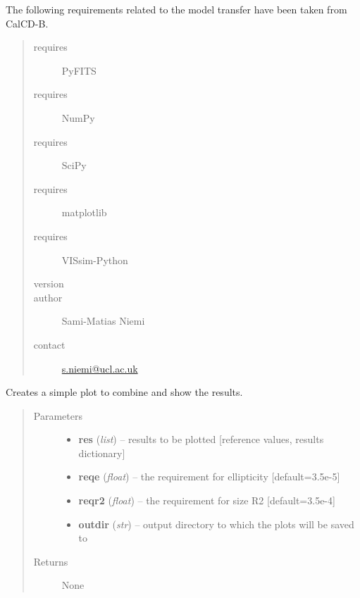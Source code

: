 \documentclass[a4paper,11pt,english]{sphinxmanual}
\begin{document}
The following requirements related to the model transfer have been taken from CalCD-B.
\begin{quote}\begin{description}
\item[{requires}] \leavevmode
PyFITS

\item[{requires}] \leavevmode
NumPy

\item[{requires}] \leavevmode
SciPy

\item[{requires}] \leavevmode
matplotlib

\item[{requires}] \leavevmode
VISsim-Python

\item[{version}] 

\item[{author}] \leavevmode
Sami-Matias Niemi

\item[{contact}] \leavevmode
\href{mailto:s.niemi@ucl.ac.uk}{s.niemi@ucl.ac.uk}

\end{description}\end{quote}

\begin{fulllineitems}
\label{analysis:analysis.nonlinearityModelTransfer.plotResults}
Creates a simple plot to combine and show the results.
\begin{quote}\begin{description}
\item[{Parameters}] \leavevmode\begin{itemize}
\item {} 
\textbf{res} (\emph{list}) -- results to be plotted {[}reference values, results dictionary{]}

\item {} 
\textbf{reqe} (\emph{float}) -- the requirement for ellipticity {[}default=3.5e-5{]}

\item {} 
\textbf{reqr2} (\emph{float}) -- the requirement for size R2 {[}default=3.5e-4{]}

\item {} 
\textbf{outdir} (\emph{str}) -- output directory to which the plots will be saved to

\end{itemize}

\item[{Returns}] \leavevmode
None

\end{description}\end{quote}

\end{fulllineitems}
\end{document}
